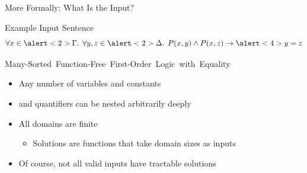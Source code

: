 \documentclass{beamer}
\begin{document}
\begin{frame}{More Formally: What Is the Input?}
  \begin{exampleblock}{Example Input Sentence}
    \[
      \forall x \in \alert<2>{\Gamma}\text{.
      }\forall y, z \in \alert<2>{\Delta}\text{.
      }P(x, y) \land P(x, z) \to \alert<4>{y=z}
    \]
  \end{exampleblock}
  \begin{block}{\mbox{\alert<2>{Many-Sorted} \alert<3>{Function-Free}
        First-Order Logic with \alert<4>{Equality}}}
  \begin{itemize}
    \item<5-> Any number of variables and constants
    \item<5-> \structure{$\exists$} and \structure{$\forall$} quantifiers can be
          nested arbitrarily deeply
    \item<5-> All domains are finite
          \begin{itemize}
            \item Solutions are functions that take domain sizes as inputs
          \end{itemize}
    \item<5-> Of course, not all valid inputs have tractable solutions
  \end{itemize}
  \end{block}
\end{frame}
\end{document}
